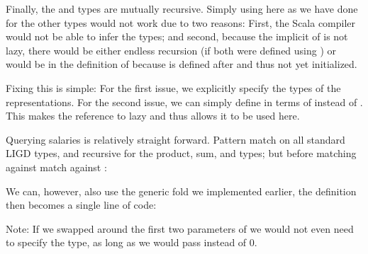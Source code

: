 Finally, the  and  types are mutually recursive. Simply
using  here as we have done for the other types would not work due
to two reasons: First, the Scala compiler would not be able to infer the types;
and second, because the implicit  of  is not lazy, there would
be either endless recursion (if both were defined using ) or 
would be  in the definition of  because  is defined
after  and thus not yet initialized.

Fixing this is simple: For the first issue, we explicitly specify the types of
the representations. For the second issue, we can simply define  in
terms of  instead of . This makes the reference to 
lazy and thus allows it to be used here.



\begin{example}

Querying salaries is relatively straight forward. Pattern match on all standard
LIGD types, and recursive for the product, sum, and  types; but before matching
against  match against :



We can, however, also use the generic fold we implemented earlier, the definition
then becomes a single line of code:



Note: If we swapped around the first two parameters of  we would not even
need to specify the  type, as long as we would pass  instead
of 0.

\end{example}

